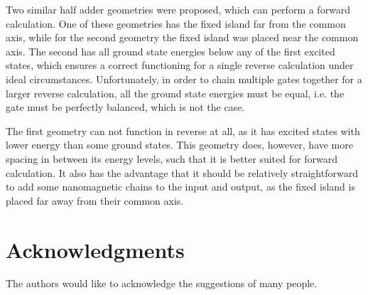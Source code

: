 \documentclass[twocolumn]{phdsymp}
\begin{document}
Two similar half adder geometries were proposed, which can perform a forward calculation. One of these geometries has the fixed island far from the common axis, while for the second geometry the fixed island was placed near the common axis. The second has all ground state energies below any of the first excited states, which ensures a correct functioning for a single reverse calculation under ideal circumstances. Unfortunately, in order to chain multiple gates together for a larger reverse calculation, all the ground state energies must be equal, i.e. the gate must be perfectly balanced, which is not the case. \par
The first geometry can not function in reverse at all, as it has excited states with lower energy than some ground states. This geometry does, however, have more spacing in between its energy levels, such that it is better suited for forward calculation. It also has the advantage that it should be relatively straightforward to add some nanomagnetic chains to the input and output, as the fixed island is placed far away from their common axis. \par


\section*{Acknowledgments}
The authors would like to acknowledge the suggestions of many people.


\nocite{*}


\end{document}
